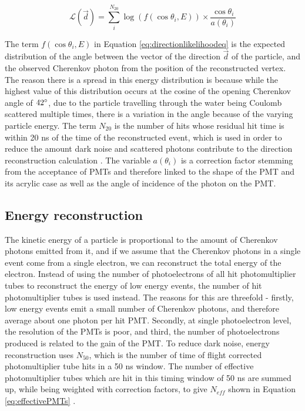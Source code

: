 \begin{equation}
    \mathcal{L}(\vec{d})=\sum_{i}^{N_{20}} \log (f(\cos\theta_{i}, E))\times\frac{\cos\theta_{i}}{a(\theta_{i})}
    \label{eq:directionlikelihoodeq}
\end{equation}

The term $f(\cos\theta_{i},E)$ in Equation \ref{eq:directionlikelihoodeq} is the expected distribution of the angle between the vector of the direction $\vec{d}$ of the particle, and the observed Cherenkov photon from the position of the reconstructed vertex. The reason there is a spread in this energy distribution is because while the highest value of this distribution occurs at the cosine of the opening Cherenkov angle of $42\degree$, due to the particle travelling through the water being Coulomb scattered multiple times, there is a variation in the angle because of the varying particle energy. The term $N_{20}$ is the number of hits whose residual hit time is within 20 ns of the time of the reconstructed event, which is used in order to reduce the amount dark noise and scattered photons contribute to the direction reconstruction calculation \cite{shiozawa1999reconstruction}. The variable $a(\theta_{i})$ is a correction factor stemming from the acceptance of PMTs and therefore linked to the shape of the PMT and its acrylic case as well as the angle of incidence of the photon on the PMT.


\subsection{Energy reconstruction}

The kinetic energy of a particle is proportional to the amount of Cherenkov photons emitted from it, and if we assume that the Cherenkov photons in a single event come from a single electron, we can reconstruct the total energy of the electron. Instead of using the number of photoelectrons of all hit photomultiplier tubes to reconstruct the energy of low energy events, the number of hit photomultiplier tubes is used instead. The reasons for this are threefold - firstly, low energy events emit a small number of Cherenkov photons, and therefore average about one photon per hit PMT. Secondly, at single photoelectron level, the resolution of the PMTs is poor, and third, the number of photoelectrons produced is related to the gain of the PMT.
\newline
To reduce dark noise, energy reconstruction uses $N_{50}$, which is the number of time of flight corrected photomultiplier tube hits in a 50 ns window. The number of effective photomultiplier tubes which are hit in this timing window of 50 ns are summed up, while being weighted with correction factors, to give $N_{eff}$ shown in Equation \ref{eq:effectivePMTs} \cite{ueno_analysis_nodate}. 

